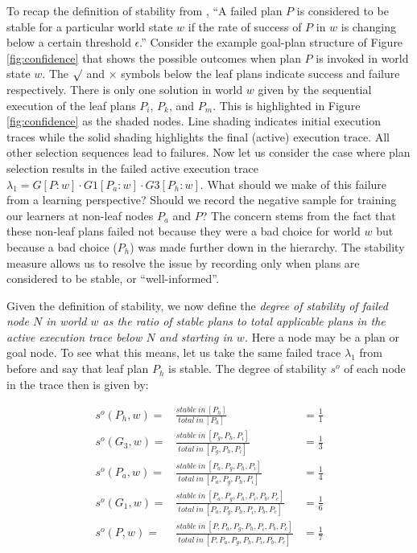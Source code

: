 To recap the definition of stability from \cite{singh10:extending}, ``A failed plan $P$ is considered to be stable for a particular world state $w$ if the rate of success of $P$ in $w$ is changing below a certain threshold $\epsilon$.'' Consider the example goal-plan structure of Figure \ref{fig:confidence} that shows the possible outcomes when plan $P$ is invoked in world state $w$. The $\surd$ and $\times$ symbols below the leaf plans indicate success and failure respectively. There is only one solution in world $w$ given by the sequential execution of the leaf plans $P_i$, $P_k$, and $P_m$. This is highlighted in Figure \ref{fig:confidence} as the shaded nodes. Line shading indicates initial execution traces while the solid shading highlights the final (active) execution trace. All other selection sequences lead to failures. Now let us consider the case where plan selection results in the failed active execution trace $\lambda_1=G[P:w] \cdot G1[P_a:w] \cdot G3[P_h:w]$. What should we make of this failure from a learning perspective? Should we record the negative sample for training our learners at non-leaf nodes $P_a$ and $P$? The concern stems from the fact that these non-leaf plans failed not because they were a bad choice for world $w$ but because a bad choice ($P_h$) was made further down in the hierarchy. The stability measure allows us to resolve the issue by recording only when plans are considered to be stable, or ``well-informed''. 

Given the definition of stability, we now define the {\em degree of stability of failed node $N$ in world $w$ as the ratio of stable plans to total applicable plans in the active execution trace below $N$ and starting in $w$.} Here a node may be a plan or goal node. To see what this means, let us take the same failed trace $\lambda_1$ from before and say that leaf plan $P_h$ is stable. The degree of stability $s^o$ of each node in the trace then is given by:

\begin{eqnarray*}
s^o(P_h,w) = & \frac{stable~in~[P_h]}{total~in~[P_h]} & = \frac{1}{1}  \\
s^o(G_3,w) = & \frac{stable~in~[P_g,P_h,P_i]}{total~in~[P_g,P_h,P_i]} & = \frac{1}{3}  \\
s^o(P_a,w) = & \frac{stable~in~[P_a,P_g,P_h,P_i]}{total~in~[P_a,P_g,P_h,P_i]} & = \frac{1}{4} \\
s^o(G_1,w) = & \frac{stable~in~[P_a,P_g,P_h,P_i,P_b,P_c]}{total~in~[P_a,P_g,P_h,P_i,P_b,P_c]} & = \frac{1}{6}  \\
s^o(P,w) = & \frac{stable~in~[P,P_a,P_g,P_h,P_i,P_b,P_c]}{total~in~[P,P_a,P_g,P_h,P_i,P_b,P_c]} & = \frac{1}{7} 
\end{eqnarray*}

